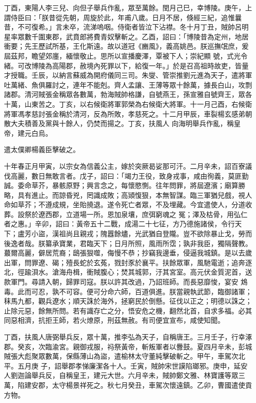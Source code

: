 \begin{pinyinscope}
 丁酉，東陽人李三兒、向但子舉兵作亂，眾至萬餘。閏月己巳，幸博陵。庚午，上謂侍臣曰：「朕昔從先朝，周旋於此，年甫八歲。日月不居，倏經三紀，追惟曩昔，不可復希。」言未卒，流涕嗚咽。侍衛者皆泣下沾襟。冬十月丁丑，賊帥呂明星率眾數千圍東郡，武賁郎將費青奴擊斬之。乙酉，詔曰：「博陵昔為定州，地居衝要；先王歷試所基，王化斯遠。故以道冠《豳風》，義高姚邑。朕巡撫氓庶，爰屆茲邦，瞻望郊廛，緬懷敬止。思所以宣播慶澤，覃被下人；崇紀顯
 號，式光令緒。可改博陵為高陽郡，赦境內死罪以下，給復一年。」於是召高祖時故吏，皆量才授職。壬辰，以納言蘇威為開府儀同三司。朱燮、管崇推劉元進為天子，遣將軍吐萬緒、魚俱羅討之，連年不能剋。齊人孟讓、王薄等眾十餘萬，據長白山，攻剽諸郡。清河賊張金稱眾各數萬，勃海賊帥格謙，自號燕王，孫宣雅自號齊王，眾各十萬，山東苦之。丁亥，以右候衛將軍郭榮為右候衛大將軍。十一月己酉，右候衛將軍馮孝慈討張金稱於清河，反為所敗，孝慈死之。十二月甲辰，車裂楊玄感弟朝散大夫積善及黨與十餘人，仍焚而揚之。丁亥，扶風人
 向海明舉兵作亂，稱皇帝，建元白烏。



 遣太僕卿楊義臣擊破之。



 十年春正月甲寅，以宗女為信義公主，嫁於突厥曷娑那可汗。二月辛未，詔百寮議伐高麗，數日無敢言者。戊子，詔曰：「竭力王役，致身戎事，咸由徇義，莫匪勤誠。委命草芥，暴骸原野；興言念之，每懷愍惻。往年問罪，將屆遼濱；廟算勝略，具有進止。而諒昏兇，罔識成敗；高熲愎狠，本無智謀。臨三軍猶兒戲，視人命如草芥；不遵成規，坐貽撓退。遂令死亡者眾，不及埋藏。今宜遣使人，分道收葬。設祭於遼西郡，立道場一所。恩加泉壤，庶弭窮魂之
 冤；澤及枯骨，用弘仁者之惠。」辛卯，詔曰：黃帝五十二戰，成湯二十七征，方乃德施諸侯，令行天下；盧芳小盜，漢祖尚且親戎；隗囂餘燼，光武猶自登隴。豈不欲除暴止戈，勞而後逸者哉。朕纂承寶業，君臨天下；日月所照，風雨所霑；孰非我臣，獨隔聲教。蕞爾高麗，僻居荒裔；鴟張狠噬，侮慢不恭；抄竊我邊垂，侵逼我城鎮。是以去歲出軍，問罪遼、碣；殪長蛇於玄菟，戮封豕於襄平。扶餘眾軍，風馳電逝；追奔逐北，徑踰浿水。滄海舟楫，衝賊腹心；焚其城郭，汙其宮室。高元伏金質泥首，送款軍門。尋請入朝，歸罪司寇。朕以許其改過，乃詔班師。而長惡靡悛，宴安
 鴆毒。此而可忍，孰不可容。便可分命六師，百道俱進。朕當親執武節，臨御諸軍；秣馬九都，觀兵遼水；順天誅於海外，拯窮民於倒懸。征伐以正之；明德以誅之；止除元惡，餘無所問。若有識存亡之分，悟安危之機，翻然北首，自求多福。必其同惡相濟，抗拒王師，若火燎原，刑茲無赦。有司便宜宣布，咸使知聞。



 丁酉，扶風人唐弼舉兵反，眾十萬，推李弘為天子，自稱唐王。三月壬子，行幸涿郡。癸亥，次臨渝宮。親御戎服，祃祭黃帝，斬叛軍者以釁鼓。夏四月辛未，彭城賊張大彪聚眾數萬，保縣薄山為盜，遣榆林太守董純擊破斬之。甲午，車駕次北平。五月庚
 子，詔舉郡孝悌廉潔各十人。壬寅，賊帥宋世謨陷瑯邪。庚申，延安人劉迦論舉兵反，自稱皇王，建元大世。六月辛未，賊帥鄭文雅、林寶護等眾三萬，陷建安郡，太守楊景祥死之。秋七月癸丑，車駕次懷遠鎮。乙卯，曹國遣使貢方物。




\end{pinyinscope}

